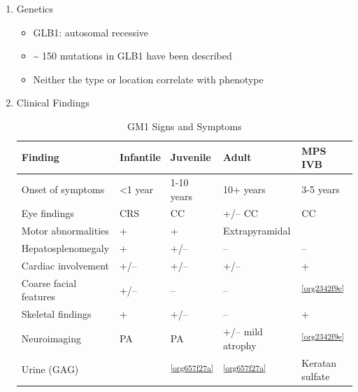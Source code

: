 \documentclass{scrartcl}
\begin{document}
\begin{enumerate}
\begin{enumerate}
\item Lysosomal multi-enzyme complex
\label{sec:org3e857a5}

\begin{itemize}
\item \(\beta\)-galactosidase forms a heterotrimeric complex with:
\begin{itemize}
\item cathepsin A/PPCA : CTSA
\item neuraminidase: NEU1
\end{itemize}

\item \(\downarrow\) cathepsin A \(\to\) 2\degree  deficiency of NEU1
\begin{itemize}
\item ML-1 (sialidosis)
\end{itemize}
\end{itemize}
\end{enumerate}

\item Genetics
\label{sec:org85fe4c0}
\begin{itemize}
\item GLB1: autosomal recessive
\item \textasciitilde{} 150 mutations in GLB1 have been described
\item Neither the type or location correlate with phenotype
\end{itemize}

\item Clinical Findings
\label{sec:orgcdfec5c}

\begin{table}[htbp]
\caption[GM1 Signs and Symptoms]{\label{tab:org330ead5}
GM1 Signs and Symptoms}
\centering
\begin{tabular}{lllll}
Finding & Infantile & Juvenile & Adult & MPS IVB\\
\hline
Onset of symptoms & <1 year & 1-10 years & 10+ years & 3-5 years\\
Eye findings & CRS & CC & +/– CC & CC\\
Motor abnormalities & + & + & Extrapyramidal & \footnotemark\\
Hepatosplenomegaly & + & +/– & – & –\\
Cardiac involvement & +/– & +/– & +/– & +\\
Coarse facial features & +/– & – & – & \textsuperscript{\ref{org2342f9e}}\\
Skeletal findings & + & +/– & – & +\\
Neuroimaging & PA & PA & +/– mild atrophy & \textsuperscript{\ref{org2342f9e}}\\
Urine (GAG) & \footnotemark & \textsuperscript{\ref{org657f27a}} & \textsuperscript{\ref{org657f27a}} & Keratan sulfate \footnotemark\\
\end{tabular}
\end{table}





\end{enumerate}
\end{document}
